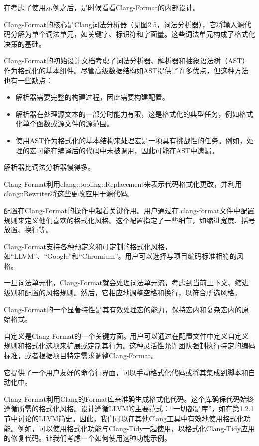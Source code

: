 在考虑了使用示例之后，是时候看看Clang-Format的内部设计。


Clang-Format的核心是Clang词法分析器（见图2.5，词法分析器），它将输入源代码分解为单个词法单元，如关键字、标识符和字面量。这些词法单元构成了格式化决策的基础。

Clang-Format的初始设计文档考虑了词法分析器、解析器和抽象语法树（AST）作为格式化的基本组件。尽管高级数据结构如AST提供了许多优点，但这种方法也有一些缺点：

\begin{itemize}
\item
解析器需要完整的构建过程，因此需要构建配置。

\item
解析器在处理源文本的一部分时能力有限，这是格式化的典型任务，例如格式化单个函数或源文件的源范围。

\item
使用AST作为格式化的基本结构来处理宏是一项具有挑战性的任务。例如，处理的宏可能在编译后的代码中未被调用，因此可能在AST中遗漏。
\end{itemize}

解析器比词法分析器慢得多。

Clang-Format利用clang::tooling::Replacement来表示代码格式化更改，并利用clang::Rewriter将这些更改应用于源代码。

配置在Clang-Format的操作中起着关键作用。用户通过在.clang-format文件中配置规则来定义他们喜欢的格式化风格。这个配置指定了一些细节，如缩进宽度、括号放置、换行等。

Clang-Format支持各种预定义和可定制的格式化风格，如“LLVM”、“Google”和“Chromium”。用户可以选择与项目编码标准相符的风格。

一旦词法单元化，Clang-Format就会处理词法单元流，考虑到当前上下文、缩进级别和配置的风格规则。然后，它相应地调整空格和换行，以符合所选风格。

Clang-Format的一个显著特性是其有效处理宏的能力，保持宏内和复杂宏内的原始格式。

自定义是Clang-Format的一个关键方面。用户可以通过在配置文件中定义自定义规则和格式化选项来扩展或定制其行为。这种灵活性允许团队强制执行特定的编码标准，或者根据项目特定需求调整Clang-Format。

它提供了一个用户友好的命令行界面，可以手动格式化代码或将其集成到脚本和自动化中。

Clang-Format利用Clang的Format库来准确生成格式化代码。这个库确保代码始终遵循所需的格式化风格。设计遵循LLVM的主要范式：“一切都是库”，如在第1.2.1节中讨论的LLVM简史。因此，我们可以在其他Clang工具中有效地使用格式化功能。例如，可以使用格式化功能与Clang-Tidy一起使用，以格式化Clang-Tidy应用的修复代码。让我们考虑一个如何使用这种功能示例。

